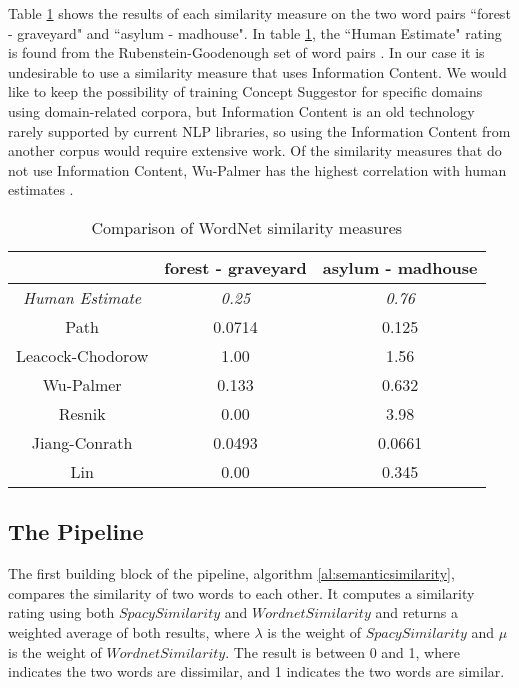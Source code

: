 \documentclass{article}
\begin{document}
Table \ref{table:wordnetsimilarity} shows the results of each similarity measure on the two word pairs ``forest - graveyard" and ``asylum - madhouse". In table \ref{table:wordnetsimilarity}, the ``Human Estimate" rating is found from the Rubenstein-Goodenough set of word pairs \cite{rubenstein1965contextual}. In our case it is undesirable to use a similarity measure that uses Information Content. We would like to keep the possibility of training Concept Suggestor for specific domains using domain-related corpora, but Information Content is an old technology rarely supported by current NLP libraries, so using the Information Content from another corpus would require extensive work. Of the similarity measures that do not use Information Content, Wu-Palmer has the highest correlation with human estimates \citep{budanitsky2006evaluating,seco2004intrinsic,mihalcea2006corpus}. %

\begin{table}[h!]
\centering
\begin{tabular}{|c||c|c|}
	\hline
	& forest - graveyard & asylum - madhouse \\
	\hline
	\textit{Human Estimate} & \textit{0.25} & \textit{0.76} \\
	Path & 0.0714 & 0.125 \\
	Leacock-Chodorow & 1.00 & 1.56 \\
	Wu-Palmer & 0.133 & 0.632 \\
	Resnik & 0.00 & 3.98 \\
	Jiang-Conrath & 0.0493 & 0.0661 \\
	Lin & 0.00 & 0.345 \\
	\hline
\end{tabular}
\caption{Comparison of WordNet similarity measures} %
\label{table:wordnetsimilarity}
\end{table}

\subsection{The Pipeline}

The first building block of the pipeline, algorithm \ref{al:semanticsimilarity}, compares the similarity of two words to each other. It computes a similarity rating using both $\textit{SpacySimilarity}$ and $\textit{WordnetSimilarity}$ and returns a weighted average of both results, where $\lambda$ is the weight of $\textit{SpacySimilarity}$ and $\mu$ is the weight of $\textit{WordnetSimilarity}$. The result is between 0 and 1, where indicates the two words are dissimilar, and 1 indicates the two words are similar.
\end{document}
